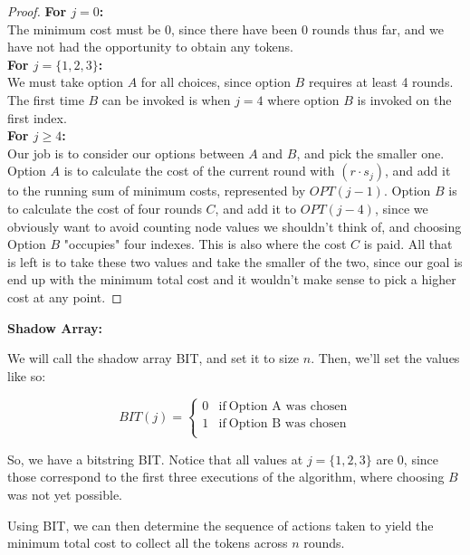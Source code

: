 \documentclass[11pt]{article}
\begin{document}
\begin{proof}
\textbf{For $j = 0$:} \\
The minimum cost must be $0$, since there have been $0$ rounds thus far, and we have not had the opportunity to obtain any tokens.\\

\textbf{For $j = \{1, 2, 3\}$:}\\
We must take option $A$ for all choices, since option $B$ requires at least 4 rounds. The first time $B$ can be invoked is when $j = 4$ where option $B$ is invoked on the first index.\\

\textbf{For $j \geq 4$:}\\
Our job is to consider our options between $A$ and $B$, and pick the smaller one. Option $A$ is to calculate the cost of the current round with $(r \cdot s_j)$, and add it to the running sum of minimum costs, represented by $OPT(j-1)$. Option $B$ is to calculate the cost of four rounds $C$, and add it to $OPT(j-4)$, since we obviously want to avoid counting node values we shouldn't think of, and choosing Option $B$ "occupies" four indexes. This is also where the cost $C$ is paid. All that is left is to take these two values and take the smaller of the two, since our goal is end up with the minimum total cost and it wouldn't make sense to pick a higher cost at any point.
\end{proof}

\textbf{Shadow Array: }

We will call the shadow array BIT, and set it to size $n$. Then, we'll set the values like so:

\begin{equation}
	BIT(j) = 
	\begin{cases}
	0 & \text{if} \ \text{Option A was chosen}\\
	1 & \text{if} \ \text{Option B was chosen}\\
	\end{cases}
\end{equation}

So, we have a bitstring BIT. Notice that all values at $j = \{1,2,3\}$ are 0, since those correspond to the first three executions of the algorithm, where choosing $B$ was not yet possible.

Using BIT, we can then determine the sequence of actions taken to yield the minimum total cost to collect all the tokens across $n$ rounds.\\
\end{document}
